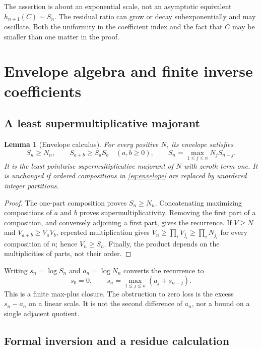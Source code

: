 \documentclass[11pt,a4paper]{article}
\numberwithin{equation}{section}
\newtheorem{lemma}[theorem]{Lemma}
\theoremstyle{definition}
\theoremstyle{remark}
\begin{document}
The assertion is about an exponential scale, not an asymptotic equivalent
$h_{n+1}(C)\sim S_n$. The residual ratio can grow or decay
subexponentially and may oscillate. Both the uniformity in the
coefficient index and the fact that $C$ may be smaller than one matter
in the proof.

\section{Envelope algebra and finite inverse coefficients}
\label{sec:envelope}

\subsection{A least supermultiplicative majorant}

\begin{lemma}[Envelope calculus]
\label{lem:envelopecalculus}
For every positive $N$, its envelope satisfies
\begin{equation}
 S_n\ge N_n,\qquad S_{a+b}\ge S_aS_b\quad(a,b\ge0),
 \qquad
 S_n=\max_{1\le j\le n}N_jS_{n-j}.
 \label{eq:envelopecalculus}
\end{equation}
It is the least pointwise supermultiplicative majorant of $N$ with zeroth
term one. It is unchanged if ordered compositions in
\eqref{eq:envelope} are replaced by unordered integer partitions.
\end{lemma}
\begin{proof}
The one-part composition proves $S_n\ge N_n$. Concatenating maximizing
compositions of $a$ and $b$ proves supermultiplicativity. Removing the
first part of a composition, and conversely adjoining a first part,
gives the recurrence. If $V\ge N$ and $V_{a+b}\ge V_aV_b$, repeated
multiplication gives
$V_n\ge\prod_iV_{j_i}\ge\prod_iN_{j_i}$ for every composition of $n$;
hence $V_n\ge S_n$. Finally, the product depends on the multiplicities of
parts, not their order.
\end{proof}

Writing $s_n=\log S_n$ and $a_n=\log N_n$ converts the recurrence to
\begin{equation}
 s_0=0,\qquad s_n=\max_{1\le j\le n}(a_j+s_{n-j}).
 \label{eq:maxplus}
\end{equation}
This is a finite max-plus closure. The obstruction to zero loss is the
excess $s_n-a_n$ on a linear scale. It is not the second difference of
$a_n$, nor a bound on a single adjacent quotient.

\subsection{Formal inversion and a residue calculation}
\end{document}
